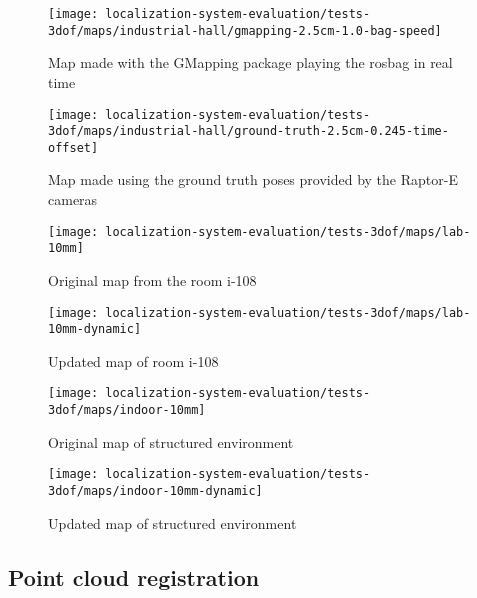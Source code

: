 \begin{figure}[H]
	\centering
	\texttt{[image: localization-system-evaluation/tests-3dof/maps/industrial-hall/gmapping-2.5cm-1.0-bag-speed]}
	\caption{Map made with the GMapping package playing the rosbag in real time}
	\label{fig:localization-system-evaluation_gmapping-2.5cm-1.0-bag-speed}
\end{figure}

\begin{figure}[H]
	\centering
	\texttt{[image: localization-system-evaluation/tests-3dof/maps/industrial-hall/ground-truth-2.5cm-0.245-time-offset]}
	\caption{Map made using the ground truth poses provided by the Raptor-E cameras}
	\label{fig:localization-system-evaluation_ground-truth-2.5cm-0.245-time-offset}
\end{figure}


\begin{figure}[H]
	\centering
	\texttt{[image: localization-system-evaluation/tests-3dof/maps/lab-10mm]}
	\caption{Original map from the room i-108}
	\label{fig:localization-system-evaluation_lab-10mm}
\end{figure}

\begin{figure}[H]
	\centering
	\texttt{[image: localization-system-evaluation/tests-3dof/maps/lab-10mm-dynamic]}
	\caption{Updated map of room i-108}
	\label{fig:localization-system-evaluation_lab-10mm-dynamic}
\end{figure}

\begin{figure}[H]
	\centering
	\texttt{[image: localization-system-evaluation/tests-3dof/maps/indoor-10mm]}
	\caption{Original map of structured environment}
	\label{fig:localization-system-evaluation_indoor-10mm}
\end{figure}

\begin{figure}[H]
	\centering
	\texttt{[image: localization-system-evaluation/tests-3dof/maps/indoor-10mm-dynamic]}
	\caption{Updated map of structured environment}
	\label{fig:localization-system-evaluation_indoor-10mm-dynamic}
\end{figure}



\subsection{Point cloud registration}

